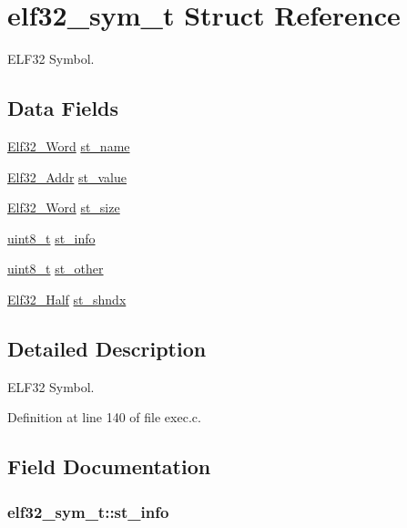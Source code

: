 \hypertarget{structelf32__sym__t}{\section{elf32\+\_\+sym\+\_\+t Struct Reference}
\label{structelf32__sym__t}
}


E\+L\+F32 Symbol.  


\subsection*{Data Fields}
\begin{DoxyCompactItemize}
\item 
\hyperlink{exec_8c_af5924ece606c732e86f8263a19408e45}{Elf32\+\_\+\+Word} \hyperlink{structelf32__sym__t_a232decf1719e5b3c2710f36527196ee0}{st\+\_\+name}
\item 
\hyperlink{exec_8c_a40c6d4571e6001f443cc6a6474620158}{Elf32\+\_\+\+Addr} \hyperlink{structelf32__sym__t_ae0b3ec7941f44c78c2328c7071144062}{st\+\_\+value}
\item 
\hyperlink{exec_8c_af5924ece606c732e86f8263a19408e45}{Elf32\+\_\+\+Word} \hyperlink{structelf32__sym__t_a2ab0bc42b4be7785283d7a9c8529c6fd}{st\+\_\+size}
\item 
\hyperlink{aplus_8h_ae0430369c5a35dcdbc0bc19dcbb33a03}{uint8\+\_\+t} \hyperlink{structelf32__sym__t_a6d8d3d0c4c824b83847583591b9a13e2}{st\+\_\+info}
\item 
\hyperlink{aplus_8h_ae0430369c5a35dcdbc0bc19dcbb33a03}{uint8\+\_\+t} \hyperlink{structelf32__sym__t_a7e4c7a5bc8b91ec5cdabbde350b5623e}{st\+\_\+other}
\item 
\hyperlink{exec_8c_a2ff0787d7d1bae0f251192806a2974ca}{Elf32\+\_\+\+Half} \hyperlink{structelf32__sym__t_a4c80a4806fb05b61db91827dc13f0666}{st\+\_\+shndx}
\end{DoxyCompactItemize}


\subsection{Detailed Description}
E\+L\+F32 Symbol. 

Definition at line 140 of file exec.\+c.



\subsection{Field Documentation}
\hypertarget{structelf32__sym__t_a6d8d3d0c4c824b83847583591b9a13e2}{
\subsubsection[{st\+\_\+info}]{ elf32\+\_\+sym\+\_\+t\+::st\+\_\+info}}\label{structelf32__sym__t_a6d8d3d0c4c824b83847583591b9a13e2}


